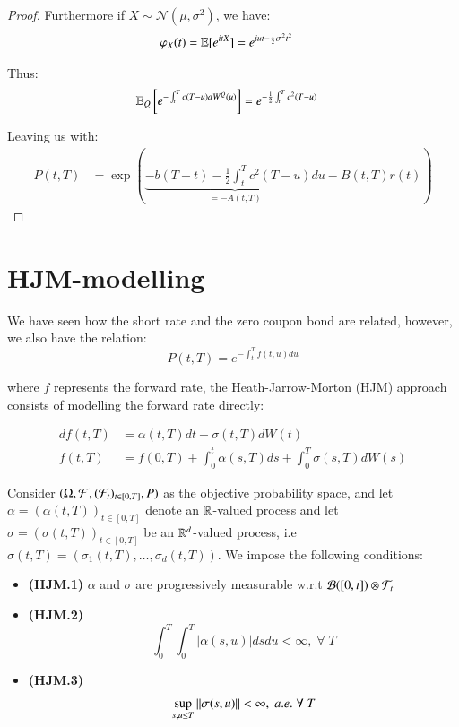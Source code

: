 \begin{proof}
Furthermore if $X\sim \mathcal{N}(\mu, \sigma^{2})$, we have: 
\begin{align*}
\varphi_{X}(t) &= \mathbb{E}[e^{itX}] = e^{iut - \frac{1}{2}\sigma^{2}t^{2}}    
\end{align*}

Thus: 
\begin{align*}
\mathbb{E}_{Q}\left[
e^{
-\int_{t}^{T}c(T-u)dW^{Q}(u)
}
\right]
&= 
e^{-\frac{1}{2}\int_{t}^{T}c^{2}(T-u)}
\end{align*}

Leaving us with: 
\begin{align*}
P(t,T) 
&= 
\exp\left(
\underbrace{
-b(T-t) -\frac{1}{2}\int_{t}^{T}c^{2}(T-u)du
}_{= -A(t,T)}
-B(t,T)r(t)
\right)
\end{align*}


\end{proof}




\section{HJM-modelling} 
We have seen how the short rate and the zero coupon bond are related, however, we also have the relation: 
\[
P(t,T) = e^{-\int_{t}^{T}f(t,u)du}
\]

where $f$ represents the forward rate, the Heath-Jarrow-Morton (HJM) 
approach consists of modelling the forward rate directly:

\begin{align*}
df(t,T) &= \alpha(t,T)dt + \sigma(t,T)dW(t) \\ 
f(t,T) &= f(0,T) + \int_{0}^{t}\alpha(s,T)ds + \int_{0}^{T}\sigma(s,T)dW(s)
\end{align*}

Consider $(\Omega, \mathcal{F}, (\mathcal{F}_{t})_{t \in [0,T]}, P)$ as the objective probability space, and let $\alpha = (\alpha(t,T))_{t \in [0,T]}$ denote an $\mathbb{R}$-valued process and let $\sigma = (\sigma(t,T))_{t \in [0,T]}$ be an $\mathbb{R}^{d}$-valued process, i.e $\sigma(t,T) = (\sigma_{1}(t,T), \dots, \sigma_{d}(t,T))$. We impose the following conditions: 
\begin{itemize}
    \item \textbf{(HJM.1)} $\alpha$ and $\sigma$ are progressively measurable w.r.t $\mathcal{B}([0,t])\otimes \mathcal{F}_{t}$
    \item \textbf{(HJM.2)}\[
    \int_{0}^{T}\int_{0}^{T}|\alpha(s,u)|dsdu < \infty,\; \forall\; T
    \]
    \item \textbf{(HJM.3)} \[
    \sup\limits_{s,u \leq T}\norm{\sigma(s,u)} < \infty,\; a.e. \;\forall\;T
    \]
\end{itemize} 

